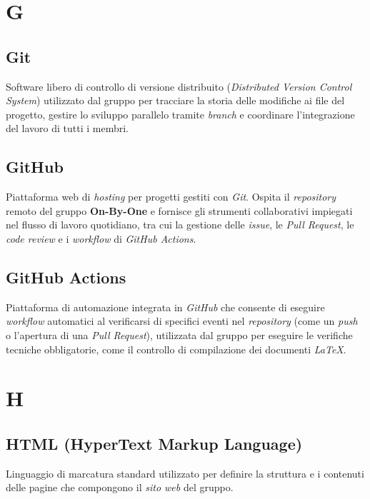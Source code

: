 \documentclass[11pt, a4paper]{article}
\begin{document}
\newpage

\section*{G}

\subsection*{Git}
Software libero di controllo di versione distribuito (\textit{Distributed Version Control System}) utilizzato dal gruppo per tracciare la storia delle modifiche ai file del progetto, gestire lo sviluppo parallelo tramite \textit{branch} e coordinare l'integrazione del lavoro di tutti i membri.

\subsection*{GitHub}
Piattaforma web di \textit{hosting} per progetti gestiti con \textit{Git}. Ospita il \textit{repository} remoto del gruppo \textbf{On-By-One} e fornisce gli strumenti collaborativi impiegati nel flusso di lavoro quotidiano, tra cui la gestione delle \textit{issue}, le \textit{Pull Request}, le \textit{code review} e i \textit{workflow} di \textit{GitHub Actions}.

\subsection*{GitHub Actions}
Piattaforma di automazione integrata in \textit{GitHub} che consente di eseguire \textit{workflow} automatici al verificarsi di specifici eventi nel \textit{repository} (come un \textit{push} o l'apertura di una \textit{Pull Request}), utilizzata dal gruppo per eseguire le verifiche tecniche obbligatorie, come il controllo di compilazione dei documenti \textit{LaTeX}.

\section*{H}

\subsection*{HTML (HyperText Markup Language)}
Linguaggio di marcatura standard utilizzato per definire la struttura e i contenuti delle pagine che compongono il \textit{sito web} del gruppo.
\end{document}
